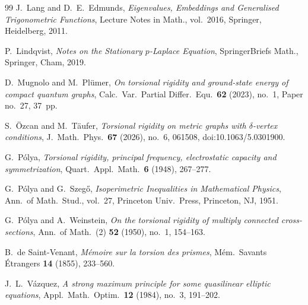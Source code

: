 \documentclass[12pt,a4paper]{article}
\numberwithin{equation}{section}
\begin{document}
\begin{thebibliography}{99}
	J.~Lang and D.~E.~Edmunds,
	\textit{Eigenvalues, Embeddings and Generalised Trigonometric
		Functions},
	Lecture Notes in Math., vol.~2016, Springer, Heidelberg, 2011.
	
	P.~Lindqvist,
	\textit{Notes on the Stationary $p$-Laplace Equation},
	SpringerBriefs Math., Springer, Cham, 2019.
	
	D.~Mugnolo and M.~Pl\"umer,
	\textit{On torsional rigidity and ground-state energy of compact
		quantum graphs},
	Calc.\ Var.\ Partial Differ.\ Equ.\ \textbf{62} (2023), no.~1,
	Paper no.~27, 37~pp.
	
	S.~\"Ozcan and M.~T\"aufer,
	\textit{Torsional rigidity on metric graphs with $\delta$-vertex
		conditions},
	J.\ Math.\ Phys.\ \textbf{67} (2026), no.~6, 061508,
	doi:10.1063/5.0301900.
	
	G.~P\'olya,
	\textit{Torsional rigidity, principal frequency, electrostatic
		capacity and symmetrization},
	Quart.\ Appl.\ Math.\ \textbf{6} (1948), 267--277.
	
	G.~P\'olya and G.~Szeg\H{o},
	\textit{Isoperimetric Inequalities in Mathematical Physics},
	Ann.\ of Math.\ Stud., vol.~27, Princeton Univ.\ Press, Princeton,
	NJ, 1951.
	
	G.~P\'olya and A.~Weinstein,
	\textit{On the torsional rigidity of multiply connected
		cross-sections},
	Ann.\ of Math.\ (2) \textbf{52} (1950), no.~1, 154--163.
	
	B.~de Saint-Venant,
	\textit{M\'emoire sur la torsion des prismes},
	M\'em.\ Savants \'Etrangers \textbf{14} (1855), 233--560.
	
	J.~L.~V\'azquez,
	\textit{A strong maximum principle for some quasilinear elliptic
		equations},
	Appl.\ Math.\ Optim.\ \textbf{12} (1984), no.~3, 191--202.
	
\end{thebibliography}
	
\end{document}
